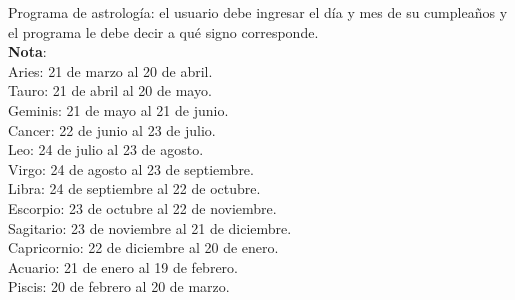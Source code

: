 \begin{ejercicio}
Programa de astrología: el usuario debe ingresar el día y mes de su cumpleaños
y el programa le debe decir a qué signo corresponde. \\
{\bf Nota}: \\
Aries: 21 de marzo al 20 de abril. \\
Tauro: 21 de abril al 20 de mayo. \\
Geminis: 21 de mayo al 21 de junio. \\
Cancer: 22 de junio al 23 de julio. \\
Leo: 24 de julio al 23 de agosto. \\
Virgo: 24 de agosto al 23 de septiembre. \\
Libra: 24 de septiembre al 22 de octubre. \\
Escorpio: 23 de octubre al 22 de noviembre. \\
Sagitario: 23 de noviembre al 21 de diciembre. \\
Capricornio: 22 de diciembre al 20 de enero. \\
Acuario: 21 de enero al 19 de febrero. \\
Piscis: 20 de febrero al 20 de marzo. \\
\end{ejercicio}
